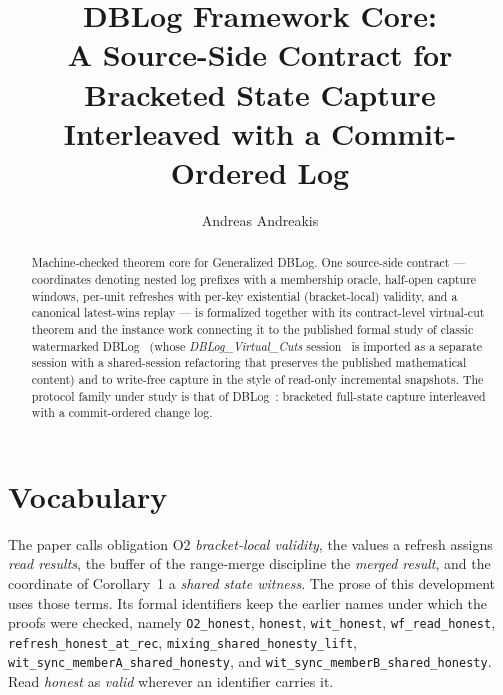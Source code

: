 \documentclass[11pt,a4paper]{article}
\begin{document}
\title{DBLog Framework Core:\\
  A Source-Side Contract for Bracketed State Capture\\
  Interleaved with a Commit-Ordered Log}
\author{Andreas Andreakis}
\maketitle

\begin{abstract}
  Machine-checked theorem core for Generalized DBLog. One
  source-side contract --- coordinates denoting nested log prefixes
  with a membership oracle, half-open capture windows, per-unit
  refreshes with per-key existential (bracket-local) validity, and a
  canonical latest-wins replay --- is formalized together with its
  contract-level virtual-cut theorem and the instance work connecting
  it to the published formal study of classic watermarked
  DBLog~\cite{andreakis2026theoretical} (whose
  \emph{DBLog\_Virtual\_Cuts} session~\cite{andreakis2026artifact} is
  imported as a separate session with a shared-session refactoring
  that preserves the published mathematical content) and to write-free
  capture in the style of
  read-only incremental snapshots. The protocol family under study is
  that of DBLog~\cite{andreakis2020dblog}: bracketed full-state
  capture interleaved with a commit-ordered change log.
\end{abstract}

\tableofcontents

\section*{Vocabulary}
The paper calls obligation O2 \emph{bracket-local validity}, the values a
refresh assigns \emph{read results}, the buffer of the range-merge
discipline the \emph{merged result}, and the coordinate of Corollary~1 a
\emph{shared state witness}. The prose of this development uses those
terms. Its formal identifiers keep the earlier names under which the
proofs were checked, namely \texttt{O2\_honest}, \texttt{honest},
\texttt{wit\_honest}, \texttt{wf\_read\_honest},
\texttt{refresh\_honest\_at\_rec}, \texttt{mixing\_shared\_honesty\_lift},
\texttt{wit\_sync\_memberA\_shared\_honesty}, and
\texttt{wit\_sync\_memberB\_shared\_honesty}. Read \emph{honest} as
\emph{valid} wherever an identifier carries it.





\end{document}
